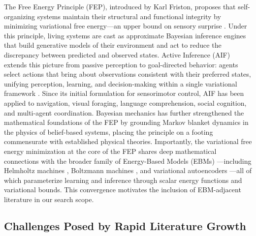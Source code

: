 \documentclass[
  english,
]{article}
\begin{document}
The Free Energy Principle (FEP), introduced by Karl Friston, proposes
that self-organizing systems maintain their structural and functional
integrity by minimizing variational free energy---an upper bound on
sensory surprise \citep{friston2006free, friston2010free}. Under this
principle, living systems are cast as approximate Bayesian inference
engines that build generative models of their environment and act to
reduce the discrepancy between predicted and observed states. Active
Inference (AIF) extends this picture from passive perception to
goal-directed behavior: agents select actions that bring about
observations consistent with their preferred states, unifying
perception, learning, and decision-making within a single variational
framework \citep{parr2022active, friston2017active}. Since its initial
formulation for sensorimotor control, AIF has been applied to
navigation, visual foraging, language comprehension, social cognition,
and multi-agent coordination. Bayesian mechanics
\citep{sakthivadivel2023bayesian} has further strengthened the
mathematical foundations of the FEP by grounding Markov blanket dynamics
in the physics of belief-based systems, placing the principle on a
footing commensurate with established physical theories. Importantly,
the variational free energy minimization at the core of the FEP shares
deep mathematical connections with the broader family of Energy-Based
Models (EBMs) \citep{lecun2006tutorial}---including Helmholtz machines
\citep{dayan1995helmholtz}, Boltzmann machines
\citep{hinton2002training}, and variational autoencoders
\citep{kingma2014auto}---all of which parameterize learning and
inference through scalar energy functions and variational bounds. This
convergence motivates the inclusion of EBM-adjacent literature in our
search scope.

\subsection{Challenges Posed by Rapid Literature
Growth}\label{challenges-posed-by-rapid-literature-growth}
\end{document}
